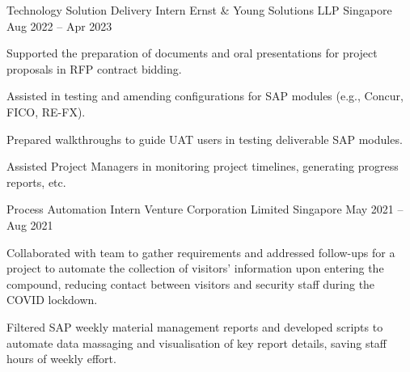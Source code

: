 

\begin{cventries}

  \cventry
  {Technology Solution Delivery Intern} %
  {Ernst \& Young Solutions LLP} %
  {Singapore} %
  {Aug 2022 – Apr 2023} %
  {
    \begin{cvitems} %
      \item {Supported the preparation of documents and oral presentations for project proposals in RFP contract bidding.}
      \item {Assisted in testing and amending configurations for SAP modules (e.g., Concur, FICO, RE-FX).}
      \item {Prepared walkthroughs to guide UAT users in testing deliverable SAP modules.}
      \item {Assisted Project Managers in monitoring project timelines, generating progress reports, etc.} \vspace{5mm}
    \end{cvitems}
  }

  \cventry
  {Process Automation Intern} %
  {Venture Corporation Limited} %
  {Singapore} %
  {May 2021 – Aug 2021} %
  {
    \begin{cvitems} %
      \item {Collaborated with team to gather requirements and addressed follow-ups for a project to automate the collection of visitors' information upon entering the compound, reducing contact between visitors and security staff during the COVID lockdown.}
      \item {Filtered SAP weekly material management reports and developed scripts to automate data massaging and visualisation of key report details, saving staff hours of weekly effort.} \vspace{5mm}
    \end{cvitems}
  }


\end{cventries}
